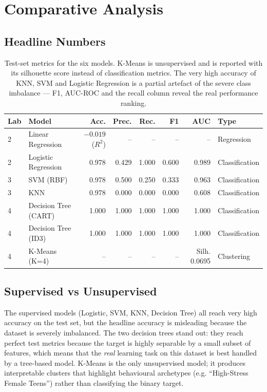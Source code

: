 \documentclass[11pt,a4paper]{article}
\begin{document}
\newpage
\section{Comparative Analysis}

\subsection{Headline Numbers}

\begin{table}[H]
    \centering
    \small
    \begin{tabular}{llrrrrrl}
        \toprule
        \textbf{Lab} & \textbf{Model} & \textbf{Acc.} & \textbf{Prec.} & \textbf{Rec.} & \textbf{F1} & \textbf{AUC} & \textbf{Type} \\
        \midrule
        2 & Linear Regression       & $-0.019$ ($R^2$) & -- & -- & -- & -- & Regression \\
        2 & Logistic Regression     & 0.978 & 0.429 & 1.000 & 0.600 & 0.989 & Classification \\
        3 & SVM (RBF)               & 0.978 & 0.500 & 0.250 & 0.333 & 0.963 & Classification \\
        3 & KNN                     & 0.978 & 0.000 & 0.000 & 0.000 & 0.608 & Classification \\
        4 & Decision Tree (CART)    & 1.000 & 1.000 & 1.000 & 1.000 & 1.000 & Classification \\
        4 & Decision Tree (ID3)     & 1.000 & 1.000 & 1.000 & 1.000 & 1.000 & Classification \\
        4 & K-Means (K=4)           & --   & --   & --   & --   & Silh. 0.0695 & Clustering \\
        \bottomrule
    \end{tabular}
    \caption{Test-set metrics for the six models. K-Means is unsupervised
    and is reported with its silhouette score instead of classification
    metrics. The very high accuracy of KNN, SVM and Logistic Regression
    is a partial artefact of the severe class imbalance — F1, AUC-ROC and
    the recall column reveal the real performance ranking.}
    \label{tab:all}
\end{table}

\subsection{Supervised vs Unsupervised}
The supervised models (Logistic, SVM, KNN, Decision Tree) all reach very
high accuracy on the test set, but the headline accuracy is misleading
because the dataset is severely imbalanced. The two decision trees stand
out: they reach perfect test metrics because the target is highly
separable by a small subset of features, which means that the
\emph{real} learning task on this dataset is best handled by a tree-based
model. K-Means is the only unsupervised model; it produces interpretable
clusters that highlight behavioural archetypes (e.g. ``High-Stress Female
Teens'') rather than classifying the binary target.
\end{document}
